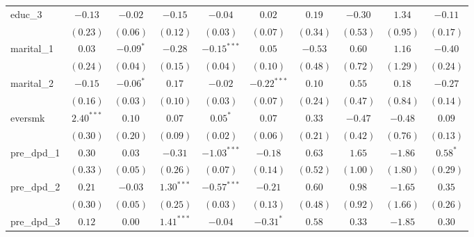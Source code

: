 \begin{tabular}{l c c c c c c c c c}
educ\_3          & $-0.13$       & $-0.02$       & $-0.15$       & $-0.04$       & $0.02$        & $0.19$         & $-0.30$       & $1.34$        & $-0.11$        \\
                 & $(0.23)$      & $(0.06)$      & $(0.12)$      & $(0.03)$      & $(0.07)$      & $(0.34)$       & $(0.53)$      & $(0.95)$      & $(0.17)$       \\
marital\_1       & $0.03$        & $-0.09^{*}$   & $-0.28$       & $-0.15^{***}$ & $0.05$        & $-0.53$        & $0.60$        & $1.16$        & $-0.40$        \\
                 & $(0.24)$      & $(0.04)$      & $(0.15)$      & $(0.04)$      & $(0.10)$      & $(0.48)$       & $(0.72)$      & $(1.29)$      & $(0.24)$       \\
marital\_2       & $-0.15$       & $-0.06^{*}$   & $0.17$        & $-0.02$       & $-0.22^{***}$ & $0.10$         & $0.55$        & $0.18$        & $-0.27$        \\
                 & $(0.16)$      & $(0.03)$      & $(0.10)$      & $(0.03)$      & $(0.07)$      & $(0.24)$       & $(0.47)$      & $(0.84)$      & $(0.14)$       \\
eversmk          & $2.40^{***}$  & $0.10$        & $0.07$        & $0.05^{*}$    & $0.07$        & $0.33$         & $-0.47$       & $-0.48$       & $0.09$         \\
                 & $(0.30)$      & $(0.20)$      & $(0.09)$      & $(0.02)$      & $(0.06)$      & $(0.21)$       & $(0.42)$      & $(0.76)$      & $(0.13)$       \\
pre\_dpd\_1      & $0.30$        & $0.03$        & $-0.31$       & $-1.03^{***}$ & $-0.18$       & $0.63$         & $1.65$        & $-1.86$       & $0.58^{*}$     \\
                 & $(0.33)$      & $(0.05)$      & $(0.26)$      & $(0.07)$      & $(0.14)$      & $(0.52)$       & $(1.00)$      & $(1.80)$      & $(0.29)$       \\
pre\_dpd\_2      & $0.21$        & $-0.03$       & $1.30^{***}$  & $-0.57^{***}$ & $-0.21$       & $0.60$         & $0.98$        & $-1.65$       & $0.35$         \\
                 & $(0.30)$      & $(0.05)$      & $(0.25)$      & $(0.03)$      & $(0.13)$      & $(0.48)$       & $(0.92)$      & $(1.66)$      & $(0.26)$       \\
pre\_dpd\_3      & $0.12$        & $0.00$        & $1.41^{***}$  & $-0.04$       & $-0.31^{*}$   & $0.58$         & $0.33$        & $-1.85$       & $0.30$         \\

\end{tabular}
